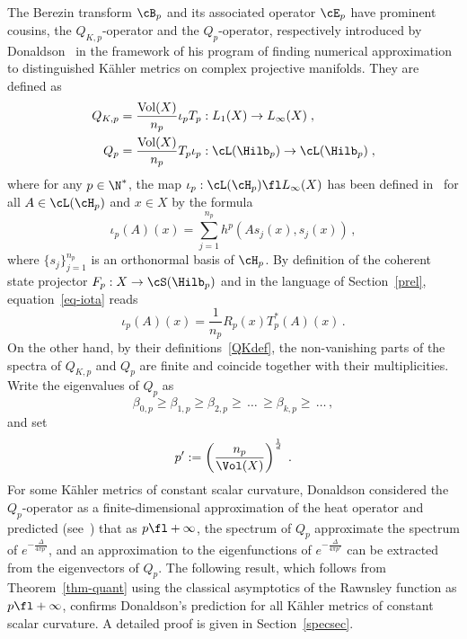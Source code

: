 The Berezin transform $\cB_p$ and its associated operator $\cE_p$ have prominent cousins, the $Q_{K,p}$-operator and the $Q_p$-operator, respectively introduced by Donaldson~\cite[Section~4]{D} in the framework of his program of finding numerical approximation to distinguished K\"ahler metrics on complex projective manifolds. They are defined as
\begin{equation}\label{QKdef}
\begin{split}
Q_{K,p}&= \frac{\text{Vol}(X)}{n_p} \iota_p T_p : L_1(X) \to L_{\infty}(X)\;,\\
Q_p &= \frac{\text{Vol}(X)}{n_p} T_p \iota_p: \cL(\Hilb_p) \to \cL(\Hilb_p)\;,
\end{split}
\end{equation}
where for any $p\in\N^*$, the map $\iota_p:\cL(\cH_p)\fl L_\infty(X)$ has been defined in~\cite[Section~2.2.1]{D} for all $A\in\cL(\cH_p)$ and $x\in X$ by the formula
\begin{equation}\label{eq-iota}
\iota_p(A)(x)=\sum_{j=1}^{n_p} h^{p}(As_j(x),s_j(x))\,,
\end{equation}
where $\{s_j\}_{j=1}^{n_p}$ is an orthonormal basis of $\cH_p$. By definition of the coherent state projector $F_p:X\rightarrow \cS(\Hilb_p)$ and in the language of Section~\ref{prel}, equation~\eqref{eq-iota} reads
\begin{equation}\label{iota=RT}
\iota_p(A)(x)=\frac{1}{n_p}R_p(x)T_p^*(A)(x)\,.
\end{equation}
On the other hand, by their definitions~\eqref{QKdef}, the non-vanishing parts of the spectra of $Q_{K,p}$ and $Q_p$ are finite and coincide together with their multiplicities. Write the eigenvalues of $Q_p$ as
\begin{equation}
\beta_{0,p}
\geq\beta_{1,p}\geq\beta_{2,p}\geq\,\dots\,\geq\beta_{k,p}\geq\,\dots\,,
\end{equation}
and set
\[
p' : = \left(\frac{n_p}{\Vol(X)}\right)^{\frac{1}{d}}\;.
\]
For some K\"ahler metrics of constant
scalar curvature, Donaldson considered the $Q_p$-operator as a finite-dimensional approximation of the heat operator and predicted (see~\cite[p.~611]{D}) that as $p\fl+\infty$, the spectrum of $Q_p$ approximate the spectrum of $e^{-\frac{\Delta}{4\pi p'} }$, and an approximation to the eigenfunctions of $e^{-\frac{\Delta}{4\pi p'} }$ can be extracted from the eigenvectors of $Q_p$. The following result, which follows from Theorem~\ref{thm-quant} using the classical asymptotics of the Rawnsley function as $p\fl+\infty$, confirms Donaldson's prediction for all K\"ahler metrics of constant scalar curvature. A detailed proof is given in Section~\ref{specsec}.

